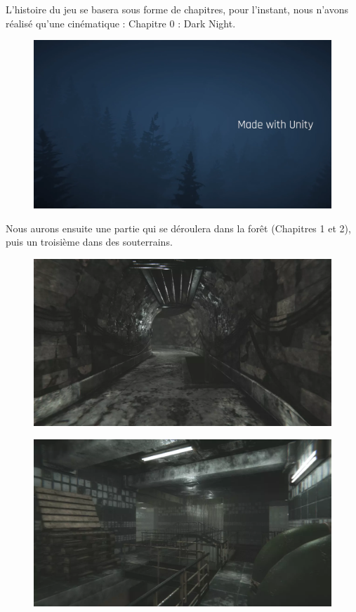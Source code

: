 L'histoire du jeu se basera sous forme de chapitres, pour l'instant, nous n'avons réalisé qu'une cinématique : Chapitre 0 : Dark Night.
\newline

\begin{figure}[H]
\centering
\begin{minipage}{.5\textwidth}
  \centering
  \centerline{\includegraphics[width=1\linewidth]{img/cine.png}}
  \label{fig:cinematique}
\end{minipage}%
\end{figure}

Nous aurons ensuite une partie qui se déroulera dans la forêt (Chapitres 1 et 2), puis un troisième dans des souterrains.
\newline

\begin{figure}[H]
\centering
\begin{minipage}{.5\textwidth}
  \centering
  \includegraphics[width=.6\linewidth]{img/assets/egouts1.png}
  \label{fig:rémi}
\end{minipage}%
\begin{minipage}{.5\textwidth}
  \centering
  \includegraphics[width=.6\linewidth]{img/assets/egouts2.png}
  \label{fig:sonia}
\end{minipage}
\end{figure}

